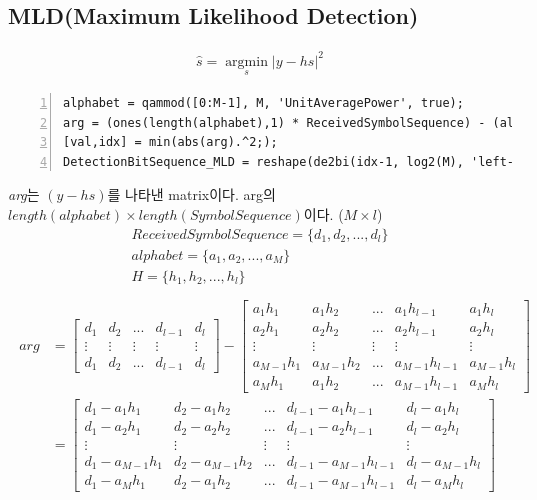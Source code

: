 \documentclass{article}
\providecommand{\abs}[1]{\lvert#1\rvert}
\begin{document}
\subsection{MLD(Maximum Likelihood Detection)}
\begin{gather}
\hat{s}=\operatorname*{argmin}_s \abs{y-hs}^2
\end{gather}
\begin{lstlisting}[style=Matlab-editor, frame=single, numbers=left,]
alphabet = qammod([0:M-1], M, 'UnitAveragePower', true);
arg = (ones(length(alphabet),1) * ReceivedSymbolSequence) - (alphabet.' * H);
[val,idx] = min(abs(arg).^2;);
DetectionBitSequence_MLD = reshape(de2bi(idx-1, log2(M), 'left-msb')', 1, []);
\end{lstlisting}
\textsl{arg}는 $(y-hs)$를 나타낸 matrix이다. arg의 $length(alphabet)\times length(SymbolSequence)$이다. ($M \times l$)
\begin{gather}
ReceivedSymbolSequence=\{d_1, d_2, ..., d_l\}\\
alphabet=\{a_1, a_2, ..., a_M\}\\
H=\{h_1, h_2, ..., h_l\}\\
\end{gather}
\begin{gather}
	\begin{split}
		arg &=
		\begin{bmatrix}
		d_1 & d_2 & ... & d_{l-1} & d_l\\
		\vdots & \vdots & \vdots & \vdots & \vdots \\
		d_1 & d_2 & ... & d_{l-1} & d_l
		\end{bmatrix}
		- 
		\begin{bmatrix}
		a_{1}h_{1} & a_{1}h_{2} & ... & a_{1}h_{l-1} & a_{1}h_{l}\\
		a_{2}h_{1} & a_{2}h_{2} & ... & a_{2}h_{l-1} & a_{2}h_{l}\\
		\vdots & \vdots & \vdots & \vdots & \vdots \\
		a_{M-1}h_{1} & a_{M-1}h_{2} & ... & a_{M-1}h_{l-1} & a_{M-1}h_{l}\\
		a_{M}h_{1} & a_{1}h_{2} & ... & a_{M-1}h_{l-1} & a_{M}h_{l}
		\end{bmatrix}\\
		&=
		\begin{bmatrix}
		d_1-a_{1}h_{1} & d_2-a_{1}h_{2} & ... & d_{l-1}-a_{1}h_{l-1} & d_{l}-a_{1}h_{l}\\
		d_1-a_{2}h_{1} & d_2-a_{2}h_{2} & ... & d_{l-1}-a_{2}h_{l-1} & d_{l}-a_{2}h_{l}\\
		\vdots & \vdots & \vdots & \vdots & \vdots \\
		d_1-a_{M-1}h_{1} & d_2-a_{M-1}h_{2} & ... & d_{l-1}-a_{M-1}h_{l-1} & d_{l}-a_{M-1}h_{l}\\
		d_1-a_{M}h_{1} & d_2-a_{1}h_{2} & ... & d_{l-1}-a_{M-1}h_{l-1} & d_{l}-a_{M}h_{l}
		\end{bmatrix}\\
	\end{split}
\end{gather}
\clearpage
\end{document}
